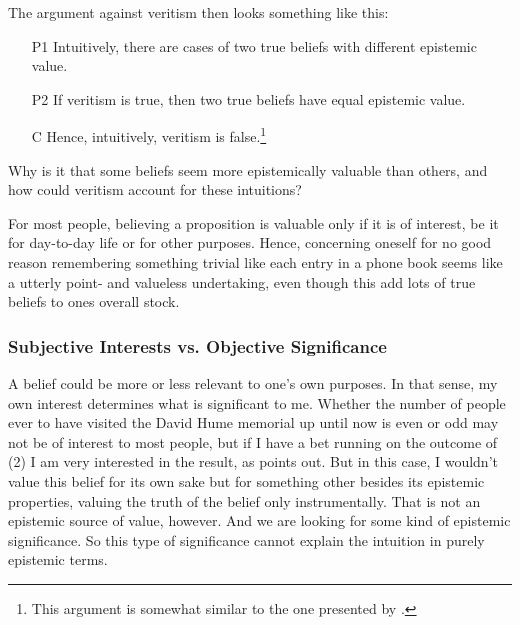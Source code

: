 \documentclass[12pt,numbers=noenddot]{scrartcl}
\begin{document}
The argument against veritism then looks something like this:

\begin{enumerate}
    \item[P1] Intuitively, there are cases of two true beliefs with different epistemic value.
    \item[P2] If veritism is true, then two true beliefs have equal epistemic value.
    \item[C] Hence, intuitively, veritism is false.\footnote{This argument is somewhat similar to the one presented by \textcite{Hu2016-HUWDT}.}
\end{enumerate}

Why is it that some beliefs seem more epistemically valuable than others, and how could veritism account for these intuitions?

For most people, believing a proposition is valuable only if it is of interest, be it for day-to-day life or for other purposes. Hence, concerning oneself for no good reason remembering something trivial like each entry in a phone book seems like a utterly point- and valueless undertaking, even though this add lots of true beliefs to ones overall stock.

\subsubsection{Subjective Interests vs. Objective Significance}
A belief could be more or less relevant to one's own purposes. In that sense, my own interest determines what is significant to me. Whether the number of people ever to have visited the David Hume memorial up until now is even or odd may not be of interest to most people, but if I have a bet running on the outcome of (2) I am very interested in the result, as \textcite[333]{Ahlstrom-Vij2013} points out. But in this case, I wouldn't value this belief for its own sake but for something other besides its epistemic properties, valuing the truth of the belief only instrumentally. That is not an epistemic source of value, however. And we are looking for some kind of epistemic significance. So this type of significance cannot explain the intuition in purely epistemic terms.
\end{document}
